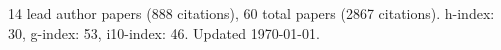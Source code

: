 14 lead author papers (888 citations),
60 total papers (2867 citations).\newline
h-index: 30, g-index: 53, i10-index: 46. Updated \today.